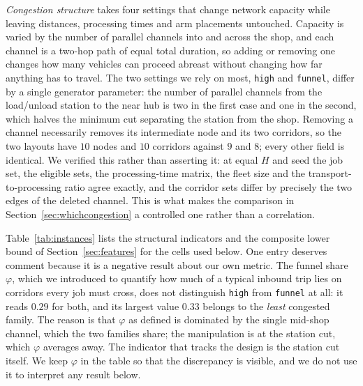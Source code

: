 \documentclass[manuscript,screen,review]{acmart}
\begin{document}
\emph{Congestion structure} takes four settings that change network capacity
while leaving distances, processing times and arm placements untouched. Capacity
is varied by the number of parallel channels into and across the shop, and each
channel is a two-hop path of equal total duration, so adding or removing one
changes how many vehicles can proceed abreast without changing how far anything
has to travel. The two settings we rely on most, \texttt{high} and
\texttt{funnel}, differ by a single generator parameter: the number of parallel
channels from the load/unload station to the near hub is two in the first case
and one in the second, which halves the minimum cut separating the station from
the shop. Removing a channel necessarily removes its intermediate node and its
two corridors, so the two layouts have $10$ nodes and $10$ corridors against $9$
and $8$; every other field is identical. We verified this rather than asserting
it: at equal $H$ and seed the job set, the eligible sets, the processing-time
matrix, the fleet size and the transport-to-processing ratio agree exactly, and
the corridor sets differ by precisely the two edges of the deleted channel.
This is what makes the comparison in Section~\ref{sec:whichcongestion} a
controlled one rather than a correlation.

Table~\ref{tab:instances} lists the structural indicators and the composite
lower bound of Section~\ref{sec:features} for the cells used below. One entry
deserves comment because it is a negative result about our own metric. The
funnel share $\varphi$, which we introduced to quantify how much of a typical
inbound trip lies on corridors every job must cross, does not distinguish
\texttt{high} from \texttt{funnel} at all: it reads $0.29$ for both, and its
largest value $0.33$ belongs to the \emph{least} congested family. The reason is
that $\varphi$ as defined is dominated by the single mid-shop channel, which the
two families share; the manipulation is at the station cut, which $\varphi$
averages away. The indicator that tracks the design is the station cut itself.
We keep $\varphi$ in the table so that the discrepancy is visible, and we do not
use it to interpret any result below.

\begin{table}[t]
\caption{The four congestion families. All cells share $8$ jobs, $24$ real
operations, $4$ arms, $4$ vehicles, $F=0.6$ and
$\bar{T}_t/\bar{T}_p\approx1.0$; \texttt{high} and \texttt{funnel} differ only
by the deletion of one parallel channel at the station. Structural indicators
are constant within a family; the lower bound varies with $H$ and is given as a
range over $H\in\{0,0.15,0.3,0.5\}$.}
\label{tab:instances}
\small

\end{table}
\end{document}
